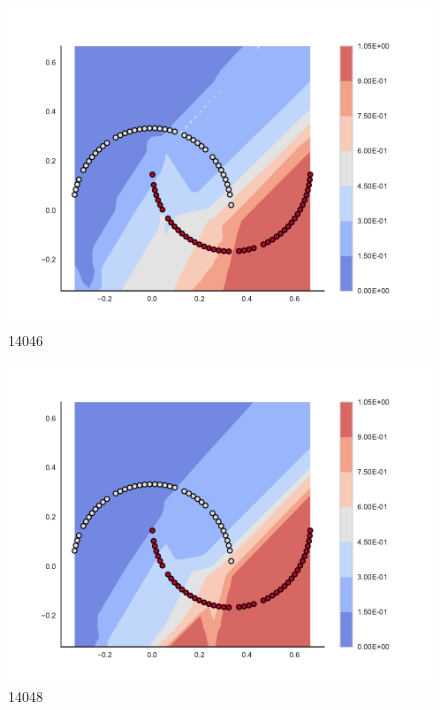 \begin{subfigure}[b]{0.09\textwidth}
    \includegraphics[clip, trim=2.35cm 1.75cm 4.5cm 0cm,width=\textwidth]{img/convergence/14046.pdf}
    \caption{14046}
    \label{fig:convergence_14046}
\end{subfigure}
%
\begin{subfigure}[b]{0.09\textwidth}
    \includegraphics[clip, trim=2.35cm 1.75cm 4.5cm 0cm,width=\textwidth]{img/convergence/14048.pdf}
    \caption{14048}
    \label{fig:convergence_14048}
\end{subfigure}
%
